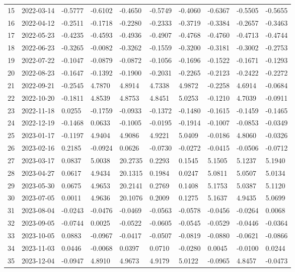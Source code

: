 \begin{footnotesize}
\begin{longtable}{llllllllll}
15 & 2022-03-14 & -0.5777 & -0.6102 & -0.4650 & -0.5749 & -0.4060 & -0.6367 & -0.5505 & -0.5655 \\
16 & 2022-04-12 & -0.2511 & -0.1718 & -0.2280 & -0.2333 & -0.3719 & -0.3384 & -0.2657 & -0.3463 \\
17 & 2022-05-23 & -0.4235 & -0.4593 & -0.4936 & -0.4907 & -0.4768 & -0.4760 & -0.4713 & -0.4744 \\
18 & 2022-06-23 & -0.3265 & -0.0082 & -0.3262 & -0.1559 & -0.3200 & -0.3181 & -0.3002 & -0.2753 \\
19 & 2022-07-22 & -0.1047 & -0.0879 & -0.0872 & -0.1056 & -0.1696 & -0.1522 & -0.1671 & -0.1293 \\
20 & 2022-08-23 & -0.1647 & -0.1392 & -0.1900 & -0.2031 & -0.2265 & -0.2123 & -0.2422 & -0.2272 \\
21 & 2022-09-21 & -0.2545 & 4.7870 & 4.8914 & 4.7338 & 4.9872 & -0.2258 & 4.6914 & -0.0684 \\
22 & 2022-10-20 & -0.1811 & 4.8539 & 4.8753 & 4.8451 & 5.0253 & -0.1210 & 4.7039 & -0.0911 \\
23 & 2022-11-18 & 0.0255 & -0.1759 & -0.0933 & -0.1372 & -0.1480 & -0.1615 & -0.1459 & -0.1465 \\
24 & 2022-12-19 & -0.1468 & 0.0633 & -0.1005 & -0.0195 & -0.1914 & -0.1007 & -0.0853 & -0.0349 \\
25 & 2023-01-17 & -0.1197 & 4.9404 & 4.9086 & 4.9221 & 5.0409 & -0.0186 & 4.8060 & -0.0326 \\
26 & 2023-02-16 & 0.2185 & -0.0924 & 0.0626 & -0.0730 & -0.0272 & -0.0415 & -0.0506 & -0.0712 \\
27 & 2023-03-17 & 0.0837 & 5.0038 & 20.2735 & 0.2293 & 0.1545 & 5.1505 & 5.1237 & 5.1940 \\
28 & 2023-04-27 & 0.0617 & 4.9434 & 20.1315 & 0.1984 & 0.0247 & 5.0811 & 5.0507 & 5.0134 \\
29 & 2023-05-30 & 0.0675 & 4.9653 & 20.2141 & 0.2769 & 0.1408 & 5.1753 & 5.0387 & 5.1120 \\
30 & 2023-07-05 & 0.0011 & 4.9636 & 20.1076 & 0.2009 & 0.1275 & 5.1637 & 4.9435 & 5.0699 \\
31 & 2023-08-04 & -0.0243 & -0.0476 & -0.0469 & -0.0563 & -0.0578 & -0.0456 & -0.0264 & 0.0068 \\
32 & 2023-09-05 & -0.0744 & 0.0025 & -0.0522 & -0.0605 & -0.0545 & -0.0529 & -0.0446 & -0.0364 \\
33 & 2023-10-05 & 0.0883 & -0.0967 & -0.0417 & -0.0507 & -0.0819 & -0.0880 & -0.0621 & -0.0866 \\
34 & 2023-11-03 & 0.0446 & -0.0068 & 0.0397 & 0.0710 & -0.0280 & 0.0045 & -0.0100 & 0.0244 \\
35 & 2023-12-04 & -0.0947 & 4.8910 & 4.9673 & 4.9179 & 5.0122 & -0.0965 & 4.8457 & -0.0473 \\
\end{longtable}
\end{footnotesize}
